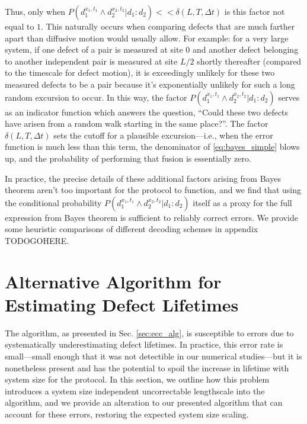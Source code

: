\documentclass[twocolumn,superscriptaddress,aps,prb,floatfix]{revtex4-1}
\newcommand{\red}[1]{{\color{red} { #1}}}
\begin{document}
Thus, only when $P(d_1^{x_1,t_1} \wedge d_2^{x_2,t_2} | d_1:d_2) << \delta(L,T,\Delta t)$ is this factor not equal to $1$.  This naturally occurs when comparing defects that are much farther apart than diffusive motion would usually allow.  For example: for a very large system, if one defect of a pair is measured at site $0$ and another defect belonging to another independent pair is measured at site $L/2$ shortly thereafter (compared to the timescale for defect motion), it is exceedingly unlikely for these two measured defects to be a pair because it's exponentially unlikely for such a long random excursion to occur.  In this way, the factor $P(d_1^{x_1,t_1} \wedge d_2^{x_2,t_2} | d_1:d_2)$  serves as an indicator function which answers the question, ``Could these two defects have arisen from a random walk starting in the same place?''.  The factor $\delta(L,T,\Delta t)$ sets the cutoff for a plausible excursion---i.e., when the error function is much less than this term, the denominator of \ref{eq:bayes_simple} blows up, and the probability of performing that fusion is essentially zero.

In practice, the precise details of these additional factors arising from Bayes theorem aren't too important for the protocol to function, and we find that using the conditional probability $P(d_1^{x_1,t_1} \wedge d_2^{x_2,t_2} | d_1:d_2)$ itself as a proxy for the full expression from Bayes theorem is sufficient to reliably correct errors.  We provide some heuristic comparisons of different decoding schemes in appendix \red{TODOGOHERE}.


\section{Alternative Algorithm for Estimating Defect Lifetimes}
\label{sec:appendix_fix_long_errors}

The algorithm, as presented in Sec. \ref{sec:ecc_alg}, is susceptible to errors due to systematically underestimating defect lifetimes.  In practice, this error rate is small---small enough that it was not detectible in our numerical studies---but it is nonetheless present and has the potential to spoil the increase in lifetime with system size for the protocol.  In this section, we outline how this problem introduces a system size independent uncorrectable lengthscale into the algorithm, and we provide an alteration to our presented algorithm that can account for these errors, restoring the expected system size scaling.
\end{document}
